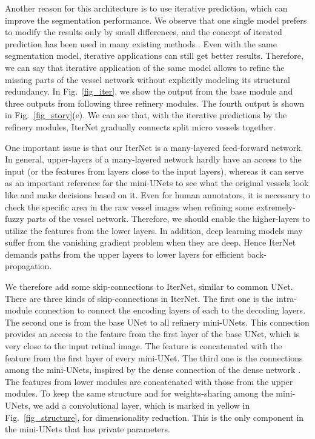 \documentclass[10pt,twocolumn,letterpaper]{article}
\begin{document}
Another reason for this architecture is to use iterative prediction, which can improve the segmentation performance. We observe that one single model prefers to modify the results only by small differences, and the concept of iterated prediction has been used in many existing methods \cite{7042289,8036917}. Even with the same segmentation model, iterative applications can still get better results. Therefore, we can say that iterative application of the same model allows to refine the missing parts of the vessel network without explicitly modeling its structural redundancy. 
In Fig.~\ref{fig_iter}, we show the output from the base module and three outputs from following three refinery modules. The fourth output is shown in Fig.~\ref{fig_story}(e). We can see that, with the iterative predictions by the refinery modules, IterNet gradually connects split micro vessels together.

One important issue is that our IterNet is a many-layered feed-forward network. In general, upper-layers of a many-layered network hardly have an access to the input (or the features from layers close to the input layers), whereas it can serve as an important reference for the mini-UNets to see what the original vessels look like and make decisions based on it. Even for human annotators, it is necessary to check the specific area in the raw vessel images when refining some extremely-fuzzy parts of the vessel network. Therefore, we should enable the higher-layers to utilize the features from the lower layers. In addition, deep learning models may suffer from the vanishing gradient problem when they are deep. Hence IterNet demands paths from the upper layers to lower layers for efficient back-propagation. 

We therefore add some skip-connections to IterNet, similar to common UNet. There are three kinds of skip-connections in IterNet. The first one is the intra-module connection to connect the encoding layers of each to the decoding layers. The second one is from the base UNet to all refinery mini-UNets. This connection provides an access to the feature from the first layer of the base UNet, which is very close to the input retinal image. The feature is concatenated with the feature from the first layer of every mini-UNet. The third one is the connections among the mini-UNets, inspired by the dense connection of the dense network \cite{8099726}. The features from lower modules are concatenated with those from the upper modules. To keep the same structure and for weights-sharing among the mini-UNets, we add a  convolutional layer, which is marked in yellow in Fig.~\ref{fig_structure}, for dimensionality reduction. This is the only component in the mini-UNets that has private parameters.
\end{document}
